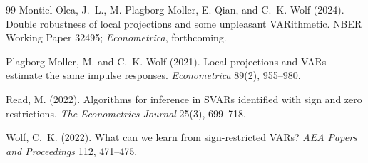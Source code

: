 \documentclass[11pt]{article}
\theoremstyle{definition}
\theoremstyle{plain}
\theoremstyle{remark}
\begin{document}
\begin{thebibliography}{99}
Montiel Olea, J.~L., M. Plagborg-Moller, E. Qian, and C.~K. Wolf (2024).
Double robustness of local projections and some unpleasant VARithmetic.
NBER Working Paper 32495; \emph{Econometrica}, forthcoming.

Plagborg-Moller, M. and C.~K. Wolf (2021).
Local projections and VARs estimate the same impulse responses.
\emph{Econometrica} 89(2), 955--980.

Read, M. (2022).
Algorithms for inference in SVARs identified with sign and zero restrictions.
\emph{The Econometrics Journal} 25(3), 699--718.

Wolf, C.~K. (2022).
What can we learn from sign-restricted VARs?
\emph{AEA Papers and Proceedings} 112, 471--475.
\end{thebibliography}
\end{document}
